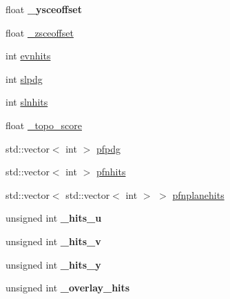 \begin{DoxyCompactItemize}
\item 
\hypertarget{classanalysis_1_1DefaultAnalysis_aa3948474002486f07a07ff52f24976ce}{float {\bfseries \-\_\-ysceoffset}}\label{classanalysis_1_1DefaultAnalysis_aa3948474002486f07a07ff52f24976ce}

\item 
float \hyperlink{classanalysis_1_1DefaultAnalysis_af2471e0f1bf6cf3c5bec18f830f41c8d}{\-\_\-zsceoffset}
\item 
int \hyperlink{classanalysis_1_1DefaultAnalysis_a32911aea589477a3832a4de8d134696d}{evnhits}
\item 
int \hyperlink{classanalysis_1_1DefaultAnalysis_a9763429d7ed32c67e96d981d14893c06}{slpdg}
\item 
int \hyperlink{classanalysis_1_1DefaultAnalysis_a9f003b22425d9db3b27eabee64700028}{slnhits}
\item 
float \hyperlink{classanalysis_1_1DefaultAnalysis_a950efb6f4e8f1ad6dd00e24bc74002c2}{\-\_\-topo\-\_\-score}
\item 
std\-::vector$<$ int $>$ \hyperlink{classanalysis_1_1DefaultAnalysis_a5d3ad6cd0930367cafe48e485aa19d20}{pfpdg}
\item 
std\-::vector$<$ int $>$ \hyperlink{classanalysis_1_1DefaultAnalysis_a8d010c569e35c153059a6db573b9542d}{pfnhits}
\item 
std\-::vector$<$ std\-::vector$<$ int $>$ $>$ \hyperlink{classanalysis_1_1DefaultAnalysis_a868edc3f02a7f71619edef7ee0d3df5c}{pfnplanehits}
\item 
\hypertarget{classanalysis_1_1DefaultAnalysis_a71d00d09f361b64c3b8491f1f83db0f9}{unsigned int {\bfseries \-\_\-hits\-\_\-u}}\label{classanalysis_1_1DefaultAnalysis_a71d00d09f361b64c3b8491f1f83db0f9}

\item 
\hypertarget{classanalysis_1_1DefaultAnalysis_a0d34f0785933a50dd9692651610b65c5}{unsigned int {\bfseries \-\_\-hits\-\_\-v}}\label{classanalysis_1_1DefaultAnalysis_a0d34f0785933a50dd9692651610b65c5}

\item 
\hypertarget{classanalysis_1_1DefaultAnalysis_a30b699a515887188545764f63babb58d}{unsigned int {\bfseries \-\_\-hits\-\_\-y}}\label{classanalysis_1_1DefaultAnalysis_a30b699a515887188545764f63babb58d}

\item 
\hypertarget{classanalysis_1_1DefaultAnalysis_aa4e3c702d047e53f6838d1655b12877a}{unsigned int {\bfseries \-\_\-overlay\-\_\-hits}}\label{classanalysis_1_1DefaultAnalysis_aa4e3c702d047e53f6838d1655b12877a}


\end{DoxyCompactItemize}
